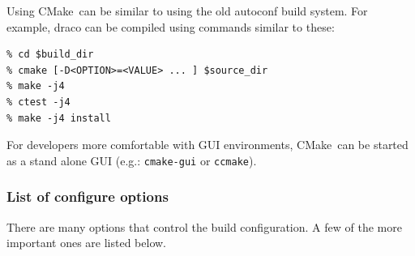 \documentclass[note]{ResearchNote_pdf}
\newcommand{\cmake}{\textsf{CMake}}
\begin{document}
Using \cmake\ can be similar to using the old autoconf build system.
For example, draco can be compiled using commands similar to these:

\begin{lstlisting}[basicstyle=\footnotesize,
    xleftmargin=1.0in, xrightmargin=1.0in]
% install -d $build_dir
% cd $build_dir
% cmake [-D<OPTION>=<VALUE> ... ] $source_dir
% make -j4
% ctest -j4
% make -j4 install
\end{lstlisting}

For developers more comfortable with GUI environments, \cmake\ can be
started as a stand alone GUI (e.g.: \texttt{cmake-gui} or
\texttt{ccmake}). 

\subsubsection{List of configure options}

There are many options that control the build configuration.  A few of
the more important ones are listed below.
\end{document}

